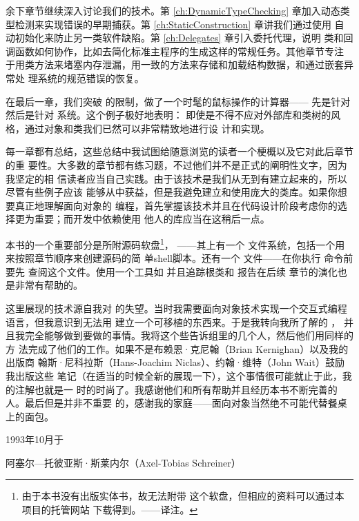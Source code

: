 余下章节继续深入讨论我们的技术。第 \ref{ch:DynamicTypeChecking} 章加入动态类
型检测来实现错误的早期捕获。第 \ref{ch:StaticConstruction} 章讲我们通过使用
自动初始化来防止另一类软件缺陷。第 \ref{ch:Delegates} 章引入委托代理，说明
类和回调函数如何协作，比如去简化标准主程序的生成这样的常规任务。其他章节专注
于用类方法来堵塞内存泄漏，用一致的方法来存储和加载结构数据，和通过嵌套异常处
理系统的规范错误的恢复。

在最后一章，我们突破 的限制，做了一个时髦的鼠标操作的计算器——
先是针对 然后是针对 系统。这个例子极好地表明：
即使是不得不应对外部库和类树的风格，通过对象和类我们已然可以非常精致地进行设
计和实现。

每一章都有总结，这些总结中我试图给随意浏览的读者一个梗概以及它对此后章节的重
要性。大多数的章节都有练习题，不过他们并不是正式的阐明性文字，因为我坚定的相
信读者应当自己实践。由于该技术是我们从无到有建立起来的，所以尽管有些例子应该
能够从中获益，但是我避免建立和使用庞大的类库。如果你想要真正地理解面向对象的
编程，首先掌握该技术并且在代码设计阶段考虑你的选择更为重要；而开发中依赖使用
他人的库应当在这稍后一点。

本书的一个重要部分是所附源码软盘\footnote{由于本书没有出版实体书，故无法附带
这个软盘，但相应的资料可以通过本项目的托管网站
下载得到。\hfill ——译注。}，
——其上有一个 文件系统，包括一个用来按照章节顺序来创建源码的简
单shell脚本。还有一个 文件——在你执行 命令前要先
查阅这个文件。使用一个工具如 并且追踪根类和 报告在后续
章节的演化也是非常有帮助的。

这里展现的技术源自我对 \cpp 的失望。当时我需要面向对象技术实现一个交互式编程
语言，但我意识到无法用 \cpp 建立一个可移植的东西来。于是我转向我所了解的
，
并且我完全能够做到要做的事情。我将这个些告诉组里的几个人，然后他们用同样的方
法完成了他们的工作。如果不是布赖恩·克尼翰（Brian Kernighan）以及我的出版商
翰斯·尼科拉斯（Hans-Joachim Niclas）、约翰·维特（John Wait）鼓励我出版这些
笔记（在适当的时候全新的展现一下），这个事情很可能就止于此，我的注解也就是一
时的时尚了。我感谢他们和所有帮助并且经历本书不断完善的人。最后但是并非不重要
的，感谢我的家庭——面向对象当然绝不可能代替餐桌上的面包。

\bigskip
\bigskip

\begin{flushright}
    1993年10月于

    阿塞尔—托彼亚斯·斯莱内尔（Axel-Tobias Schreiner）
\end{flushright}


